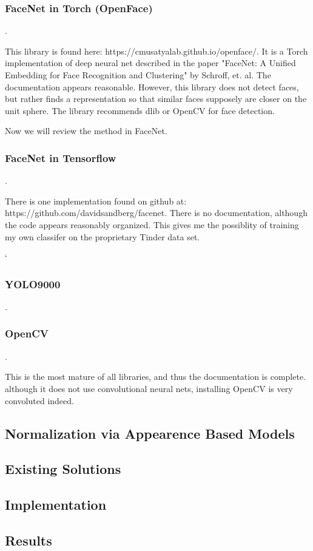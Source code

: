 \subsubsection{FaceNet in Torch (OpenFace)}.

This library is found here: https://cmusatyalab.github.io/openface/. It is a Torch implementation of deep neural net described in the paper "FaceNet: A Unified Embedding for Face Recognition and Clustering" by Schroff, et. al. The documentation appears reasonable. However, this library does not detect faces, but rather finds a representation so that similar faces supposely are closer on the unit sphere. The library recommends dlib or OpenCV for face detection. 

Now we will review the method in FaceNet. 

\subsubsection{FaceNet in Tensorflow}.

There is one implementation found on github at: https://github.com/davidsandberg/facenet. There is no documentation, although the code appears reasonably organized. This gives me the possiblity of training my own classifer on the proprietary Tinder data set.

`\subsubsection{YOLO9000}.


\subsubsection{OpenCV}.

This is the most mature of all libraries, and thus the documentation is complete. although it does not use convolutional neural nets, installing OpenCV is very convoluted indeed. 



\subsection{Normalization via Appearence Based Models}



\subsection{Existing Solutions}


\subsection{Implementation}


\subsection{Results}



